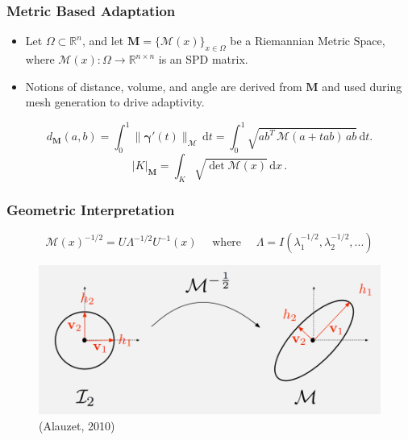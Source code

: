 \documentclass{beamer}
\newcommand{\RR}{\mathbb{R}}
\begin{document}
  \begin{frame}
  \frametitle{Metric Based Adaptation}
  \begin{itemize}
	\item Let $\Omega \subset  \RR^n$, and let $\textbf{M} = \{\mathcal{M}(x)\}_{x \in \Omega}$ be a Riemannian Metric Space, where $\mathcal{M}(x): \Omega \to \RR^{n \times n}$ is an SPD matrix.
	\vfill
	\item Notions of distance, volume, and angle are derived from $\textbf{M}$ and used during mesh generation to drive adaptivity.  
  \end{itemize}
  \begin{equation*}
	d_{\textbf{M}}(a,b) 
	= \int_{0}^{1} \| \boldsymbol{\gamma}'(t) \|_{\mathcal{M}} \, \mathrm{d}t 
	= \int_{0}^{1} \sqrt{ ab^T \, \mathcal{M}( a + t ab ) \, ab} \, \mathrm{d}t.
  \end{equation*}
  \begin{equation*}
	|K|_{\textbf{M}} = \int_{K} \sqrt{\det\mathcal{M}(x)} \, \mathrm{d}x\,.
  \end{equation*}
  \end{frame}


  \begin{frame}
	\frametitle{Geometric Interpretation}
	\begin{equation*}
		\mathcal{M}(x)^{-1/2} = U \Lambda^{-1/2} U^{-1}(x)\quad \text{ where } \quad \Lambda = I(\lambda_1^{-1/2}, \lambda_2^{-1/2}, ...)
	\end{equation*}
	\begin{figure}
		\includegraphics[width=\textwidth]{Figures/IdentityMap.png}
		\caption{(Alauzet, 2010)}
	\end{figure}
  \end{frame}
\end{document}
